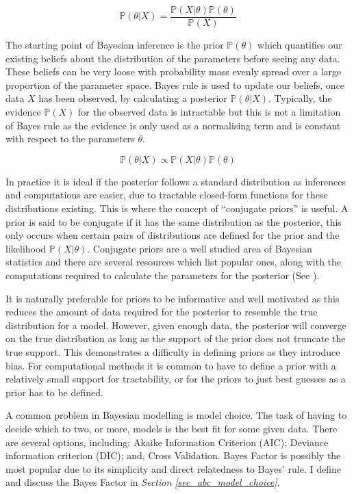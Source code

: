 \documentclass[11pt,a4paper]{article}
\newcommand*{\prob}{\mathbb{P}}
\theoremstyle{break}
\begin{document}
  \[ \prob(\theta|X)=\frac{\prob(X|\theta)\prob(\theta)}{\prob(X)} \]

  \par The starting point of Bayesian inference is the prior $\prob(\theta)$ which quantifies our existing beliefs about the distribution of the parameters before seeing any data. These beliefs can be very loose with probability mass evenly spread over a large proportion of the parameter space. Bayes rule is used to update our beliefs, once data $X$ has been observed, by calculating a posterior $\prob(\theta|X)$. Typically, the evidence $\prob(X)$ for the observed data is intractable but this is not a limitation of Bayes rule as the evidence is only used as a normalising term and is constant with respect to the parameters $\theta$.

  \[ \prob(\theta|X)\propto\prob(X|\theta)\prob(\theta) \]

  \par In practice it is ideal if the posterior follows a standard distribution as inferences and computations are easier, due to tractable closed-form functions for these distributions existing. This is where the concept of ``conjugate priors'' is useful. A prior is said to be conjugate if it has the same distribution as the posterior, this only occurs when certain pairs of distributions are defined for the prior and the likelihood $\prob(X|\theta)$. Conjugate priors are a well studied area of Bayesian statistics and there are several resources which list popular ones, along with the computations required to calculate the parameters for the posterior (See \cite[]{compendium_of_conjugate_priors}).

  \par It is naturally preferable for priors to be informative and well motivated as this reduces the amount of data required for the posterior to resemble the true distribution for a model. However, given enough data, the posterior will converge on the true distribution as long as the support of the prior does not truncate the true support. This demonstrates a difficulty in defining priors as they introduce bias. For computational methods it is common to have to define a prior with a relatively small support for tractability, or for the priors to just best guesses as a prior has to be defined. %


  \par A common problem in Bayesian modelling is model choice. The task of having to decide which to two, or more, models is the best fit for some given data. There are several options, including: Akaike Information Criterion (AIC); Deviance information criterion (DIC); and, Cross Validation. Bayes Factor is possibly the most popular due to its simplicity and direct relatedness to Bayes' rule. I define and discuss the Bayes Factor in \textit{Section \ref{sec_abc_model_choice}}.
\end{document}
